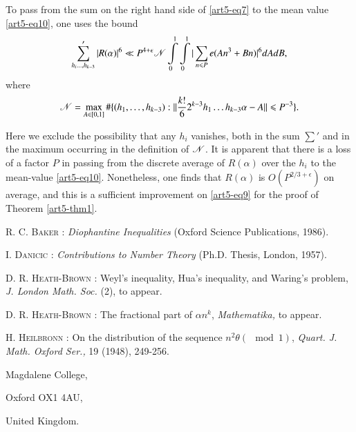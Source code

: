 To pass from the sum on the right hand side of \eqref{art5-eq7} to the mean value \eqref{art5-eq10}, one uses the bound
$$
\sum\limits'_{h_i \ldots, h_{k-3}} |R(\alpha)|^6 \ll P^{4 +\epsilon} \mathscr{N} \int\limits^1_0 \int\limits^1_0 |\sum\limits_{n\leqslant P} e (An^3 + Bn)|^6 d A d B,
$$
where 
$$
\mathscr{N} = \max\limits_{A \in [0,1]} \# \{(h_1, \ldots, h_{k-3}) : ||\frac{k!}{6} 2^{k-3} h_1\ldots h_{k-3} \alpha -A|| \leqslant P^{-3}\} .
$$

Here we exclude the possibility that any $h_i$ vanishes, both in the sum $\sum'$ and in the maximum occurring in the definition of $\mathscr{N}$. It is apparent that there is a loss of a factor $P$ in passing from the discrete average of $R(\alpha)$ over the $h_i$ to the mean-value \eqref{art5-eq10}. Nonetheless, one finds that $R(\alpha)$ is $O(P^{2/3 + \epsilon})$ on average, and this is a sufficient improvement on \eqref{art5-eq9} for the proof of Theorem \ref{art5-thm1}.

\begin{thebibliography}{99}
 \textsc{R. C. Baker} : \textit{Diophantine Inequalities} (Oxford Science Publications, 1986).

 \textsc{I. Danicic} : \textit{Contributions to Number Theory} (Ph.D. Thesis, London, 1957).

 \textsc{D. R. Heath-Brown}  : Weyl's inequality, Hua's inequality, and Waring's problem, \textit{J. London Math. Soc.} (2), to appear.

 \textsc{D. R. Heath-Brown} : The fractional part of $\alpha n^k$, \textit{Mathematika,} to appear. 

 \textsc{H. Heilbronn} : On the distribution of the sequence $n^2 \theta (\mod 1)$, \textit{Quart. J. Math. Oxford Ser.,} 19 (1948), 249-256.
\end{thebibliography}

\medskip
\noindent
{\small Magdalene College,}

\noindent
{\small Oxford OX1 4AU,}

\noindent
{\small United Kingdom.}


